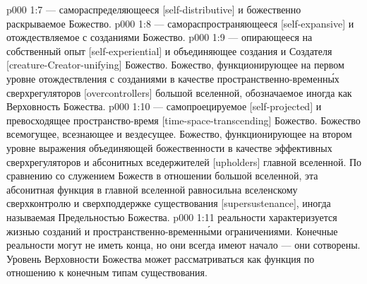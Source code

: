 \vs p000 1:7 \bibnobreakspace {} --- самораспределяющееся [self\hyp{}distributive] и божественно раскрываемое Божество.
\vs p000 1:8 \bibnobreakspace {} --- самораспространяющееся [self\hyp{}expansive] и отождествляемое с созданиями Божество.
\vs p000 1:9 \bibnobreakspace {} --- опирающееся на собственный опыт [self\hyp{}experiential] и объединяющее создания и Создателя [creature\hyp{}Creator\hyp{}unifying] Божество. Божество, функционирующее на первом уровне отождествления с созданиями в качестве пространственно\hyp{}временн\'ых сверхрегуляторов [overcontrollers] большой вселенной, обозначаемое иногда как Верховность Божества.
\vs p000 1:10 \bibnobreakspace {} --- самопроецируемое [self\hyp{}projected] и превосходящее пространство\hyp{}время [time\hyp{}space\hyp{}trans\-cen\-ding] Божество. Божество всемогущее, всезнающее и вездесущее. Божество, функционирующее на втором уровне выражения объединяющей божественности в качестве эффективных сверхрегуляторов и абсонитных вседержителей [upholders] главной вселенной. По сравнению со служением Божеств в отношении большой вселенной, эта абсонитная функция в главной вселенной равносильна вселенскому сверхконтролю и сверхподдержке существования [supersustenance], иногда называемая Предельностью Божества.
\vs p000 1:11 \pc {} реальности характеризуется жизнью созданий и пространственно\hyp{}временн\'ыми ограничениями. Конечные реальности могут не иметь конца, но они всегда имеют начало --- они сотворены. Уровень Верховности Божества может рассматриваться как функция по отношению к конечным типам существования.

